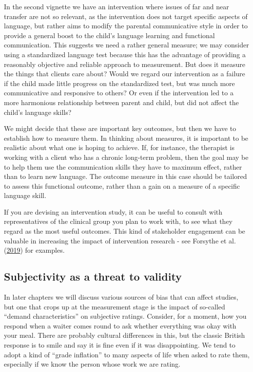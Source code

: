 \documentclass{krantz}
\begin{document}
In the second vignette we have an intervention where issues of far and near transfer are not so relevant, as the intervention does not target specific aspects of language, but rather aims to modify the parental communicative style in order to provide a general boost to the child's language learning and functional communication. This suggests we need a rather general measure; we may consider using a standardized language test because this has the advantage of providing a reasonably objective and reliable approach to measurement. But does it measure the things that clients care about? Would we regard our intervention as a failure if the child made little progress on the standardized test, but was much more communicative and responsive to others? Or even if the intervention led to a more harmonious relationship between parent and child, but did not affect the child's language skills?

We might decide that these are important key outcomes, but then we have to establish how to measure them. In thinking about measures, it is important to be realistic about what one is hoping to achieve. If, for instance, the therapist is working with a client who has a chronic long-term problem, then the goal may be to help them use the communication skills they have to maximum effect, rather than to learn new language. The outcome measure in this case should be tailored to assess this functional outcome, rather than a gain on a measure of a specific language skill.

If you are devising an intervention study, it can be useful to consult with representatives of the clinical group you plan to work with, to see what they regard as the most useful outcomes. This kind of stakeholder engagement can be valuable in increasing the impact of intervention research - see Forsythe et al. (\protect\hyperlink{ref-forsythe2019}{2019}) for examples.

\hypertarget{subjectivity-as-a-threat-to-validity}{%
\subsection{Subjectivity as a threat to validity}\label{subjectivity-as-a-threat-to-validity}}

In later chapters we will discuss various sources of bias that can affect studies, but one that crops up at the measurement stage is the impact of so-called ``demand characteristics'' on subjective ratings. Consider, for a moment, how you respond when a waiter comes round to ask whether everything was okay with your meal. There are probably cultural differences in this, but the classic British response is to smile and say it is fine even if it was disappointing. We tend to adopt a kind of ``grade inflation'' to many aspects of life when asked to rate them, especially if we know the person whose work we are rating.
\end{document}
